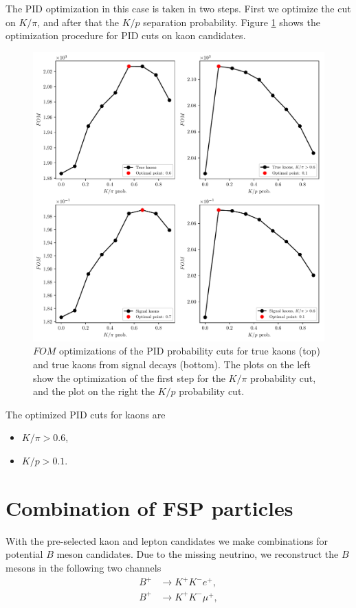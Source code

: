 \documentclass[  headings=standardclasses,
  headings=big,oneside,a4paper,openany,12pt]{scrbook}
\begin{document}
The PID optimization in this case is taken in two steps. First we optimize the cut on $K / \pi$, and after that the $K/p$ separation probability. Figure \ref{fig:Kfom} shows the optimization procedure for PID cuts on kaon candidates.

\begin{figure}[H]
\centering
\captionsetup{width=.8\linewidth}
\includegraphics[width=\linewidth]{fig/FSP_kaon_fom}
\caption{$FOM$ optimizations of the PID probability cuts for true kaons (top) and true kaons from signal decays (bottom). The plots on the left show the optimization of the first step for the $K / \pi$ probability cut, and the plot on the right the $K/p$ probability cut.}
\label{fig:Kfom}
\end{figure}

The optimized PID cuts for kaons are
\begin{itemize}
\item $K/\pi > 0.6$,
\item $K/p > 0.1$.
\end{itemize}

\section{Combination of FSP particles}

With the pre-selected kaon and lepton candidates we make combinations for potential $B$ meson candidates. Due to the missing neutrino, we reconstruct the $B$ mesons in the following two channels
\begin{align*}
B^+ &\to K^+ K^- e^+, \\
B^+ &\to K^+ K^- \mu^+,
\end{align*}
\end{document}
